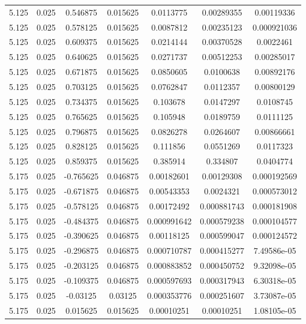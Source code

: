 \begin{table}[bh]
\begin{center}
{\begin{tabular}{ccccccc}
5.125	 & 0.025 & 	0.546875	 & 0.015625	 & 0.0113775	 & 0.00289355	 & 0.00119336 \\ 
5.125	 & 0.025 & 	0.578125	 & 0.015625	 & 0.0087812	 & 0.00235123	 & 0.000921036 \\ 
5.125	 & 0.025 & 	0.609375	 & 0.015625	 & 0.0214144	 & 0.00370528	 & 0.0022461 \\ 
5.125	 & 0.025 & 	0.640625	 & 0.015625	 & 0.0271737	 & 0.00512253	 & 0.00285017 \\ 
5.125	 & 0.025 & 	0.671875	 & 0.015625	 & 0.0850605	 & 0.0100638	 & 0.00892176 \\ 
5.125	 & 0.025 & 	0.703125	 & 0.015625	 & 0.0762847	 & 0.0112357	 & 0.00800129 \\ 
5.125	 & 0.025 & 	0.734375	 & 0.015625	 & 0.103678	 & 0.0147297	 & 0.0108745 \\ 
5.125	 & 0.025 & 	0.765625	 & 0.015625	 & 0.105948	 & 0.0189759	 & 0.0111125 \\ 
5.125	 & 0.025 & 	0.796875	 & 0.015625	 & 0.0826278	 & 0.0264607	 & 0.00866661 \\ 
5.125	 & 0.025 & 	0.828125	 & 0.015625	 & 0.111856	 & 0.0551269	 & 0.0117323 \\ 
5.125	 & 0.025 & 	0.859375	 & 0.015625	 & 0.385914	 & 0.334807	 & 0.0404774 \\ 
5.175	 & 0.025 & 	-0.765625	 & 0.046875	 & 0.00182601	 & 0.00129308	 & 0.000192569 \\ 
5.175	 & 0.025 & 	-0.671875	 & 0.046875	 & 0.00543353	 & 0.0024321	 & 0.000573012 \\ 
5.175	 & 0.025 & 	-0.578125	 & 0.046875	 & 0.00172492	 & 0.000881743	 & 0.000181908 \\ 
5.175	 & 0.025 & 	-0.484375	 & 0.046875	 & 0.000991642	 & 0.000579238	 & 0.000104577 \\ 
5.175	 & 0.025 & 	-0.390625	 & 0.046875	 & 0.00118125	 & 0.000599047	 & 0.000124572 \\ 
5.175	 & 0.025 & 	-0.296875	 & 0.046875	 & 0.000710787	 & 0.000415277	 & 7.49586e-05 \\ 
5.175	 & 0.025 & 	-0.203125	 & 0.046875	 & 0.000883852	 & 0.000450752	 & 9.32098e-05 \\ 
5.175	 & 0.025 & 	-0.109375	 & 0.046875	 & 0.000597693	 & 0.000317943	 & 6.30318e-05 \\ 
5.175	 & 0.025 & 	-0.03125	 & 0.03125	 & 0.000353776	 & 0.000251607	 & 3.73087e-05 \\ 
5.175	 & 0.025 & 	0.015625	 & 0.015625	 & 0.00010251	 & 0.00010251	 & 1.08105e-05 \\ 

\end{tabular}}
\end{center}
\end{table}
